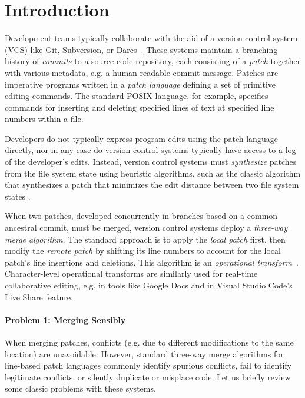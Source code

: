 
\section{Introduction}%
\label{sec:Introduction}

Development teams typically collaborate with the aid of a version control system (VCS) like Git, Subversion, or Darcs~\cite{DBLP:conf/haskell/Roundy05}. 
These systems maintain a branching history of \emph{commits} to a source code repository, each consisting of a \emph{patch} together with various metadata, e.g. a human-readable commit message. Patches are imperative programs written in a 
\emph{patch language} defining a set of primitive editing commands.
The standard POSIX  language, for example, specifies commands for inserting and deleting specified lines of text at specified line numbers within a file. 

Developers do not typically express program edits using the patch language directly, nor in any case do version control systems typically have access to a log of the developer's edits. Instead, version control systems must \emph{synthesize} patches from the file system state using heuristic algorithms, such as the classic  algorithm that synthesizes a patch that minimizes the edit distance between two file system states \cite{DiffAlgorithm}.

When two patches, developed concurrently in branches based on a common ancestral commit, must be merged, version control systems deploy a \emph{three-way merge algorithm}. The standard approach is to apply the \emph{local patch} first, then modify the \emph{remote patch} by shifting its line numbers to account for the local patch's line insertions and deletions. This algorithm is an \emph{operational transform}~\cite{DBLP:conf/sigmod/EllisG89}. 
Character-level operational transforms are similarly used for real-time collaborative editing, e.g. in tools like Google Docs and in Visual Studio Code's Live Share feature. 

\paragraph{Problem 1: Merging Sensibly} 
When merging patches, conflicts (e.g. due to different modifications to the same location) are unavoidable. However, 
standard three-way merge algorithms for line-based patch languages commonly identify spurious conflicts, fail to identify legitimate conflicts, or silently duplicate or misplace code. Let us briefly review some classic problems with these systems. 

